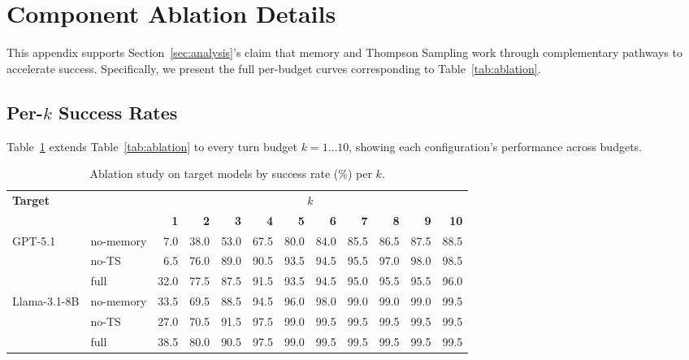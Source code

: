 \section{Component Ablation Details}
\label{app:ablation}

This appendix supports Section~\ref{sec:analysis}'s claim that memory and Thompson Sampling work through complementary pathways to accelerate success.
Specifically, we present the full per-budget curves corresponding to Table~\ref{tab:ablation}.

\subsection{Per-\texorpdfstring{$k$}{k} Success Rates}
Table~\ref{tab:ablation_full} extends Table~\ref{tab:ablation} to every turn budget $k=1 \dots 10$, showing each configuration's performance across budgets.

\begin{table}[htbp]
      \centering
      \caption{Ablation study on target models by success rate (\%) per $k$.}
      \label{tab:ablation_full}
      \footnotesize
      \begin{tabular}{@{}llrrrrrrrrrr@{}} \toprule
            \multirow{2}{*}{\textbf{Target}} &           & \multicolumn{10}{c}{\bfseries\boldmath $k$} \\ \cmidrule(lr){3-12}
                                    &           & \textbf{1} & \textbf{2} & \textbf{3} & \textbf{4} & \textbf{5} & \textbf{6} & \textbf{7} & \textbf{8} & \textbf{9} & \textbf{10} \\ \midrule
            \multirow{3}{*}{GPT-5.1}
                                    & no-memory & 7.0                      & 38.0 & 53.0 & 67.5 & 80.0 & 84.0 & 85.5 & 86.5 & 87.5 & 88.5 \\
                                    & no-TS     & 6.5                      & 76.0 & 89.0 & 90.5 & 93.5 & 94.5 & 95.5 & 97.0 & 98.0 & 98.5 \\
                                    & full      & 32.0                     & 77.5 & 87.5 & 91.5 & 93.5 & 94.5 & 95.0 & 95.5 & 95.5 & 96.0 \\ \midrule
            \multirow{3}{*}{Llama-3.1-8B}
                                    & no-memory & 33.5                     & 69.5 & 88.5 & 94.5 & 96.0 & 98.0 & 99.0 & 99.0 & 99.0 & 99.5 \\
                                    & no-TS     & 27.0                     & 70.5 & 91.5 & 97.5 & 99.0 & 99.5 & 99.5 & 99.5 & 99.5 & 99.5 \\
                                    & full      & 38.5                     & 80.0 & 90.5 & 97.5 & 99.0 & 99.5 & 99.5 & 99.5 & 99.5 & 99.5 \\ \bottomrule
      \end{tabular}
\end{table}

